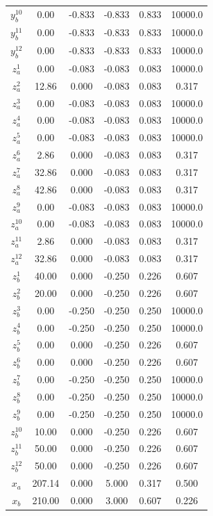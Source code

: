\documentclass[a4paper,11pt]{article}
\begin{document}
\begin{longtable}{cccccc}
$y_b^{10}$ & 0.00 & -0.833 & -0.833 & 0.833 & 10000.0\\
$y_b^{11}$ & 0.00 & -0.833 & -0.833 & 0.833 & 10000.0\\
$y_b^{12}$ & 0.00 & -0.833 & -0.833 & 0.833 & 10000.0\\
$z_a^{1}$ & 0.00 & -0.083 & -0.083 & 0.083 & 10000.0\\
\addlinespace
$z_a^{2}$ & 12.86 & 0.000 & -0.083 & 0.083 & 0.317\\
$z_a^{3}$ & 0.00 & -0.083 & -0.083 & 0.083 & 10000.0\\
$z_a^{4}$ & 0.00 & -0.083 & -0.083 & 0.083 & 10000.0\\
$z_a^{5}$ & 0.00 & -0.083 & -0.083 & 0.083 & 10000.0\\
$z_a^{6}$ & 2.86 & 0.000 & -0.083 & 0.083 & 0.317\\
\addlinespace
$z_a^{7}$ & 32.86 & 0.000 & -0.083 & 0.083 & 0.317\\
$z_a^{8}$ & 42.86 & 0.000 & -0.083 & 0.083 & 0.317\\
$z_a^{9}$ & 0.00 & -0.083 & -0.083 & 0.083 & 10000.0\\
$z_a^{10}$ & 0.00 & -0.083 & -0.083 & 0.083 & 10000.0\\
$z_a^{11}$ & 2.86 & 0.000 & -0.083 & 0.083 & 0.317\\
\addlinespace
$z_a^{12}$ & 32.86 & 0.000 & -0.083 & 0.083 & 0.317\\
$z_b^{1}$ & 40.00 & 0.000 & -0.250 & 0.226 & 0.607\\
$z_b^{2}$ & 20.00 & 0.000 & -0.250 & 0.226 & 0.607\\
$z_b^{3}$ & 0.00 & -0.250 & -0.250 & 0.250 & 10000.0\\
$z_b^{4}$ & 0.00 & -0.250 & -0.250 & 0.250 & 10000.0\\
\addlinespace
$z_b^{5}$ & 0.00 & 0.000 & -0.250 & 0.226 & 0.607\\
$z_b^{6}$ & 0.00 & 0.000 & -0.250 & 0.226 & 0.607\\
$z_b^{7}$ & 0.00 & -0.250 & -0.250 & 0.250 & 10000.0\\
$z_b^{8}$ & 0.00 & -0.250 & -0.250 & 0.250 & 10000.0\\
$z_b^{9}$ & 0.00 & -0.250 & -0.250 & 0.250 & 10000.0\\
\addlinespace
$z_b^{10}$ & 10.00 & 0.000 & -0.250 & 0.226 & 0.607\\
$z_b^{11}$ & 50.00 & 0.000 & -0.250 & 0.226 & 0.607\\
$z_b^{12}$ & 50.00 & 0.000 & -0.250 & 0.226 & 0.607\\
$x_a$ & 207.14 & 0.000 & 5.000 & 0.317 & 0.500\\
$x_b$ & 210.00 & 0.000 & 3.000 & 0.607 & 0.226\\*
\end{longtable}
\endgroup{}
\end{document}
